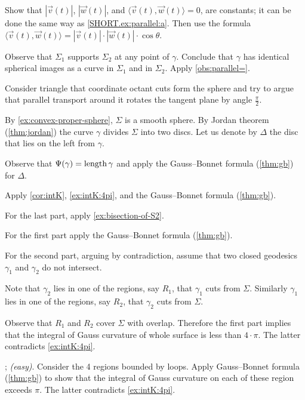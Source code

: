 \parit{\ref{SHORT.ex:parallel:b}}
Show that $|\vec v(t)|$, $|\vec w(t)|$, and
$\langle\vec v(t),\vec w(t)\rangle=0$,
are constants; it can be done the same way as \ref{SHORT.ex:parallel:a}.
Then use the formula 
$\langle\vec v(t),\vec w(t)\rangle=|\vec v(t)|\cdot|\vec w(t)|\cdot\cos\theta$.

\setcounter{eqtn}{0}

Observe that $\Sigma_1$ supports $\Sigma_2$ at any point of $\gamma$.
Conclude that $\gamma$ has identical spherical images as a curve in $\Sigma_1$ and in $\Sigma_2$.
Apply \ref{obs:parallel=}.

Consider triangle that coordinate octant cuts form the sphere and try to argue that parallel transport around it rotates the tangent plane by angle $\tfrac\pi 2$. 

\setcounter{eqtn}{0}

By \ref{ex:convex-proper-sphere}, $\Sigma$ is a smooth sphere.
By Jordan theorem (\ref{thm:jordan}) the curve $\gamma$ divides $\Sigma$  into two discs.
Let us denote by $\Delta$ the disc that lies on the left from $\gamma$.

Observe that $\Psi({\gamma})=\mathop{\rm length}\nolimits\gamma$ and apply  the Gauss--Bonnet formula (\ref{thm:gb}) for $\Delta$.

Apply \ref{cor:intK}, \ref{ex:intK:4pi}, and the Gauss--Bonnet formula (\ref{thm:gb}).

For the last part, apply \ref{ex:bisection-of-S2}.

 For the first part apply the Gauss--Bonnet formula (\ref{thm:gb}).

For the second part, arguing by contradiction, assume that two closed geodesics $\gamma_1$ and $\gamma_2$ do not intersect.

Note that $\gamma_2$ lies in one of the regions, say $R_1$, that $\gamma_1$ cuts  from $\Sigma$.
Similarly $\gamma_1$ lies in one of the regions, say $R_2$, that $\gamma_2$ cuts  from $\Sigma$.

Observe that $R_1$ and $R_2$ cover $\Sigma$ with overlap.
Therefore the first part implies that the integral of Gauss curvature of whole surface is less than $4\cdot\pi$.
The latter contradicts \ref{ex:intK:4pi}.

\parbf{\ref{ex:self-intersections}}; \textit{(easy)}.
Consider the 4 regions bounded by loops.
Apply Gauss--Bonnet formula (\ref{thm:gb}) to show that the integral of Gauss curvature on each of these region exceeds $\pi$.
The latter contradicts \ref{ex:intK:4pi}.

